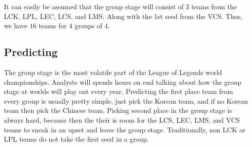 \documentclass[11pt]{article}
\theoremstyle{plain}
\theoremstyle{definition}
\numberwithin{equation}{section}
\numberwithin{theorem}{section}
\numberwithin{lemma}{section}
\numberwithin{definition}{section}
\numberwithin{proposition}{section}
\numberwithin{corollary}{section}
\begin{document}
	
	It can easily be assumed that the group stage will consist of $3$ teams from the LCK, LPL, LEC, LCS, and LMS. Along with the 1st seed from the VCS. Thus, we have $16$ teams for $4$ groups of $4$.
	
\subsection{Predicting}
	The group stage is the most volatile part of the League of Legends world championships. Analysts will spends hours on end talking about how the group stage at worlds will play out every year. Predicting the first place team from every group is usually pretty simple, just pick the Korean team, and if no Korean team then pick the Chinese team. Picking second place in the group stage is always hard, because then the their is room for the LCS, LEC, LMS, and VCS teams to sneak in an upset and leave the group stage. Traditionally, non LCK or LPL teams do not take the first seed in a group.
	
\end{document}
